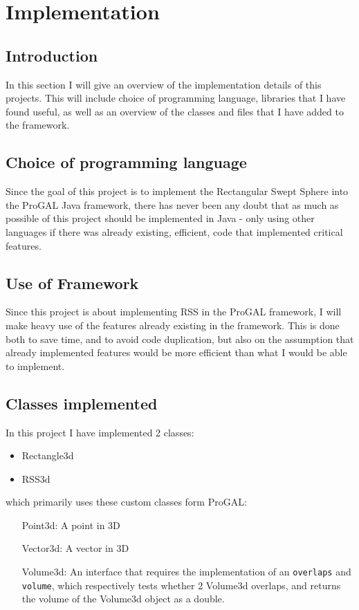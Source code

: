 
\section{Implementation}
\label{implementation}

\subsection{Introduction}
In this section I will give an overview of the implementation details of this projects. This will include choice of programming language, libraries that I have found useful, as well as an overview of the classes and files that I have added to the framework.

\subsection{Choice of programming language}
Since the goal of this project is to implement the Rectangular Swept Sphere into the ProGAL Java framework, there has never been any doubt that as much as possible of this project should be implemented in Java - only using other languages if there was already existing, efficient, code that implemented critical features.

\subsection{Use of Framework}
Since this project is about implementing RSS in the ProGAL framework, I will make heavy use of the features already existing in the framework. This is done both to save time, and to avoid code duplication, but also on the assumption that already implemented features would be more efficient than what I would be able to implement.

\subsection{Classes implemented}
In this project I have implemented 2 classes:
\begin{itemize}
\item Rectangle3d
\item RSS3d
\end{itemize}

which primarily uses these custom classes form ProGAL:

\begin{itemize}
\item[Point3d:] A point in 3D
\item[Vector3d:] A vector in 3D
\item[Volume3d:] An interface that requires the implementation of an \texttt{overlaps} and \texttt{volume}, which respectively tests whether 2 Volume3d overlaps, and returns the volume of the Volume3d object as a double.
\end{itemize}

